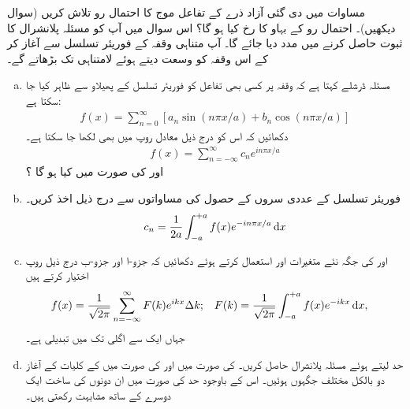 مساوات    میں دی گئی آزاد ذرے کے تفاعل موج کا احتمال رو  تلاش کریں (سوال  دیکھیں)۔ احتمال رو کے بہاو کا رخ کیا ہو گا؟
اس سوال میں آپ کو مسئلہ پلانشرال کا ثبوت حاصل کرنے میں مدد دیا جائے گا۔ آپ متناہی وقفہ کے فوریئر تسلسل سے آغاز کر کے اس وقفہ کو وسعت دیتے ہوئے لامتناہی تک بڑھاتے گے۔ 

\begin{enumerate}[a. ]
\item 
مسئلہ ڈرشلے کہتا ہے کہ وقفہ  پر کسی بھی تفاعل   کو فوریئر تسلسل کے پھیلاو سے ظاہر کیا جا سکتا ہے:
\begin{align*}
f(x) = \sum_{n=0}^{\infty} [ a_{n}\sin(  n\pi x/a )  + b_{n}\cos(  n\pi x/a )]
\end{align*}
دکھائیں کہ اس کو درج ذیل معادل روپ میں بھی لکھا جا سکتا ہے۔
\begin{align*}
f(x) = \sum_{n=-\infty}^{\infty} c_{n}e^{i n \pi x /a }
\end{align*}
 اور   کی صورت میں  کیا ہو گا ؟
 \item
 فوریئر تسلسل کے عددی سروں کے حصول کی مساواتوں سے درج ذیل اخذ کریں۔
\begin{align*}
c_{n} = \frac{1}{2a} \int_{-a}^{+a} f(x)e^{-in\pi x/a} \dif x
\end{align*}
\item
{}  اور   کی جگہ نئے متغیرات   اور 
  استعمال کرتے ہوئے  دکھائیں کہ جزو-ا اور جزو-ب درج ذیل روپ اختیار کرتے ہیں 
\begin{align*}
f(x) &= \frac{1}{\sqrt{2 \pi }} \sum_{n=-\infty}^{\infty} F(k)e^{ikx} \Delta k; && F(k) = \frac{1}{\sqrt{2\pi}} \int_{-a}^{+a} f(x) e^{-ikx} \dif x,
\end{align*}
جہاں ایک  سے اگلی  تک  میں تبدیلی   ہے۔ 
\item
حد   لیتے ہوئے مسئلہ پلانشرال حاصل کریں۔    کی صورت میں  اور   کی صورت میں    کے کلیات کے آغاز دو بالکل مختلف جگہوں  ہوئیں۔  اس کے باوجود  حد  کی صورت میں ان دونوں کی ساخت ایک دوسرے کے ساتھ مشابہت رکھتی ہیں۔ 
\end{enumerate}
